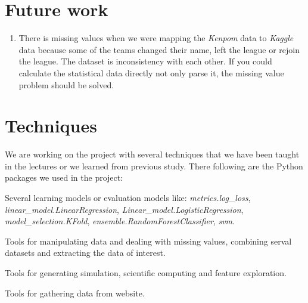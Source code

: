 \documentclass[
10pt, %
a4paper, %
oneside, %
headinclude,footinclude, %
BCOR5mm, %
]{scrartcl}
\begin{document}

\section{Future work}
\begin{enumerate}
\item There is missing values when we were mapping the \textit{Kenpom} data to \textit{Kaggle} data because some of the teams changed their name, left the league or rejoin the league. The dataset is inconsistency with each other. If you could calculate the statistical data directly not only parse it, the missing value problem should be solved.
\end{enumerate}


\section{Techniques}
We are working on the project with several techniques that we have been taught in the lectures or we learned from previous study. There following are the Python packages we used in the project:
\begin{description}[align=right]
\item[scikit-learn] Several learning models or evaluation models like: \textit{metrics.log\_loss}, \textit{linear\_model.LinearRegression}, \textit{Linear\_model.LogisticRegression}, \textit{model\_selection.KFold}, \textit{ensemble.RandomForestClassifier}, \textit{svm}.
\item [pandas] Tools for manipulating data and dealing with missing values, combining serval datasets and extracting the data of interest.  
\item [numpy] Tools for generating simulation, scientific computing and feature exploration.
\item [scrapy] Tools for gathering data from website.
\end{description}



\end{document}

